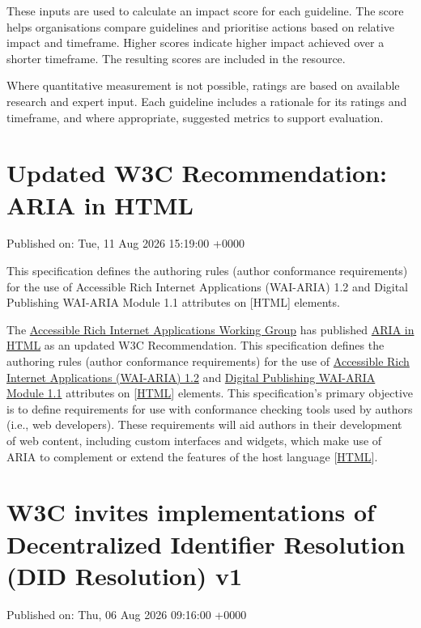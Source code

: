 \documentclass[11pt,a4paper]{article}
\begin{document}
These inputs are used to calculate an impact score for each guideline. The score helps organisations compare guidelines and prioritise actions based on relative impact and timeframe. Higher scores indicate higher impact achieved over a shorter timeframe. The resulting scores are included in the resource.

Where quantitative measurement is not possible, ratings are based on available research and expert input. Each guideline includes a rationale for its ratings and timeframe, and where appropriate, suggested metrics to support evaluation.

\section{Updated W3C Recommendation: ARIA in HTML}

Published on: Tue, 11 Aug 2026 15:19:00 +0000

This specification defines the authoring rules (author conformance requirements) for the use of Accessible Rich Internet Applications (WAI-ARIA) 1.2 and Digital Publishing WAI-ARIA Module 1.1 attributes on [HTML] elements.

The \href{https://www.w3.org/groups/wg/aria/}{Accessible Rich Internet Applications Working Group} has published \href{https://www.w3.org/TR/2026/REC-html-aria-20260811/}{ARIA in HTML} as an updated W3C Recommendation. This specification defines the authoring rules (author conformance requirements) for the use of \href{https://www.w3.org/TR/wai-aria-1.2/}{Accessible Rich Internet Applications (WAI-ARIA) 1.2} and \href{https://www.w3.org/TR/dpub-aria-1.1/}{Digital Publishing WAI-ARIA Module 1.1} attributes on [\href{https://www.w3.org/TR/2026/REC-html-aria-20260811/\#bib-html}{HTML}] elements. This specification's primary objective is to define requirements for use with conformance checking tools used by authors (i.e., web developers). These requirements will aid authors in their development of web content, including custom interfaces and widgets, which make use of ARIA to complement or extend the features of the host language [\href{https://www.w3.org/TR/2026/REC-html-aria-20260811/\#bib-html}{HTML}].

\section{W3C invites implementations of Decentralized Identifier Resolution (DID Resolution) v1}

Published on: Thu, 06 Aug 2026 09:16:00 +0000
\end{document}
